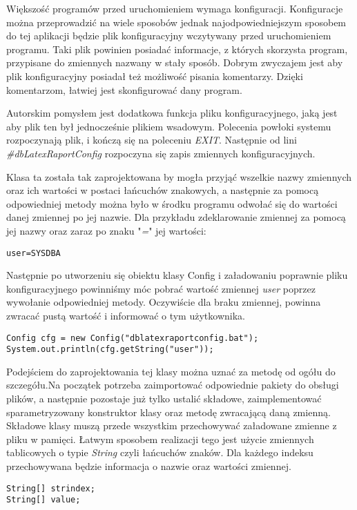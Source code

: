 Większość programów przed uruchomieniem wymaga konfiguracji. Konfiguracje można przeprowadzić na wiele sposobów jednak najodpowiedniejszym sposobem do tej aplikacji będzie plik konfiguracyjny wczytywany przed uruchomieniem programu. Taki plik powinien posiadać informacje, z których skorzysta program, przypisane do zmiennych nazwany w stały sposób.  Dobrym zwyczajem jest aby plik konfiguracyjny posiadał też możliwość pisania komentarzy. Dzięki komentarzom, łatwiej jest skonfigurować dany program.
\par
Autorskim pomysłem jest dodatkowa funkcja pliku konfiguracyjnego, jaką jest aby plik ten był jednocześnie plikiem wsadowym. Polecenia powłoki systemu rozpoczynają plik, i kończą się na poleceniu \emph{EXIT}. Następnie od lini \emph{\#dbLatexRaportConfig} rozpoczyna się zapis zmiennych konfiguracyjnych.
\par
Klasa ta została tak zaprojektowana by mogła przyjąć wszelkie nazwy zmiennych oraz ich wartości w postaci łańcuchów znakowych, a następnie za pomocą odpowiedniej metody można było w środku programu odwołać się do wartości danej zmiennej po jej nazwie. Dla przykładu zdeklarowanie zmiennej za pomocą jej nazwy oraz zaraz po znaku "\emph{=}"  jej wartości:
\begin{lstlisting}
user=SYSDBA
\end{lstlisting}
Następnie po utworzeniu się obiektu klasy Config i załadowaniu poprawnie pliku konfiguracyjnego powinniśmy móc pobrać wartość  zmiennej \emph{user} poprzez wywołanie odpowiedniej metody. Oczywiście dla braku zmiennej, powinna zwracać pustą wartość i informować o tym użytkownika.
\begin{lstlisting}
Config cfg = new Config("dblatexraportconfig.bat");
System.out.println(cfg.getString("user"));
\end{lstlisting}

Podejściem do zaprojektowania tej klasy można uznać za metodę od ogółu do szczegółu.Na początek potrzeba zaimportować odpowiednie pakiety do obsługi plików, a następnie pozostaje już tylko ustalić składowe, zaimplementować sparametryzowany konstruktor klasy oraz metodę zwracającą daną zmienną. Składowe klasy muszą przede wszystkim przechowywać załadowane zmienne z pliku w pamięci. Łatwym sposobem realizacji tego jest użycie zmiennych tablicowych o typie \emph{String} czyli łańcuchów znaków. Dla każdego indeksu przechowywana będzie informacja o nazwie oraz wartości zmiennej. 
\begin{lstlisting}
String[] strindex;
String[] value; 
\end{lstlisting}

